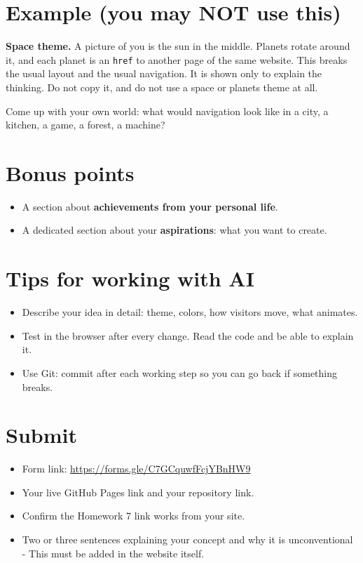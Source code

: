 \documentclass[11pt]{article}
\begin{document}
\section*{Example (you may NOT use this)}
\begin{warn}
\textbf{Space theme.} A picture of you is the sun in the middle. Planets rotate around it, and each planet is an \texttt{href} to another page of the same website. This breaks the usual layout and the usual navigation. It is shown only to explain the thinking. Do not copy it, and do not use a space or planets theme at all.
\end{warn}
Come up with your own world: what would navigation look like in a city, a kitchen, a game, a forest, a machine?

\section*{Bonus points}
\begin{itemize}[leftmargin=*]
\item A section about \textbf{achievements from your personal life}.
\item A dedicated section about your \textbf{aspirations}: what you want to create.
\end{itemize}

\section*{Tips for working with AI}
\begin{itemize}[leftmargin=*]
\item Describe your idea in detail: theme, colors, how visitors move, what animates.
\item Test in the browser after every change. Read the code and be able to explain it.
\item Use Git: commit after each working step so you can go back if something breaks.
\end{itemize}

\section*{Submit}
\begin{itemize}[leftmargin=*]
\item Form link: \url{https://forms.gle/C7GCquwfFcjYBnHW9}
\item Your live GitHub Pages link and your repository link.
\item Confirm the Homework 7 link works from your site.
\item Two or three sentences explaining your concept and why it is unconventional - This must be added in the website itself.
\end{itemize}
\end{document}
